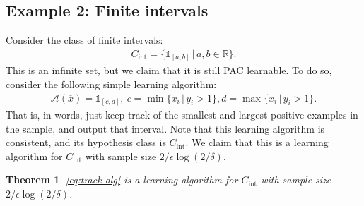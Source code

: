 \documentclass{article}
\newcommand{\calA}{\mathcal{A}}
\newcommand{\R}{\mathbb{R}}
\newtheorem{theorem}{Theorem}
\newcommand{\one}{\mathds{1}}
\begin{document}
\subsection{Example 2: Finite intervals} 
Consider the class of finite intervals:
\begin{align*}
    C_{\mathrm{int}} = \{ \one_{[a,b]} \, \vert \, a,b \in \R\}.
\end{align*}
This is an infinite set, but we claim that it is still PAC learnable. To do so, consider the following simple learning algorithm:
\begin{align}
    \calA(\overline{x}) =\one_[c,d], \  c=\min \{x_i \, \vert \, y_i>1\}, d= \max \{x_i \, \vert \, y_i>1\}. \label{eq:track-alg}
\end{align}
That is, in words, just keep track of the smallest and largest positive examples in the sample, and output that interval. Note that this learning algorithm is consistent, and its hypothesis class is $C_{\mathrm{int}}$. We claim that this is a learning algorithm for $C_{\mathrm{int}}$ with sample size $2/\epsilon \log(2/\delta)$.
\begin{theorem}
    \eqref{eq:track-alg} is a learning algorithm for $C_{\mathrm{int}}$ with sample size  $2/\epsilon \log(2/\delta)$.
\end{theorem}
\end{document}
